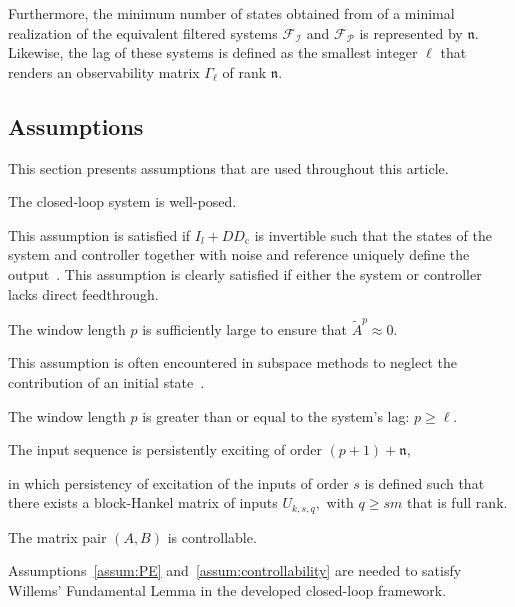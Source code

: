Furthermore, the minimum number of states obtained from of a minimal realization of the equivalent filtered systems $\mathcal{F}_\mathcal{I}$ and $\mathcal{F}_\mathcal{P}$ is represented by $\mathfrak{n}$. Likewise, the lag of these systems is defined as the smallest integer $\ell$ that renders an observability matrix $\Gamma_\ell$ of rank $\mathfrak{n}$.

\subsection{Assumptions}
This section presents assumptions that are used throughout this article.
\begin{assum}\label{assum:well_posed}
    The closed-loop system is well-posed.
\end{assum}
This assumption is satisfied if $I_l+DD_\mathrm{c}$ is invertible such that the states of the system and controller together with noise and reference uniquely define the output~\citep{VanOverschee1997}. This assumption is clearly satisfied if either the system or controller lacks direct feedthrough.
\begin{assum}\label{assum:initial_contribution}
    The window length $p$ is sufficiently large to ensure that $\tilde{A}^p\approx0$.
\end{assum}
This assumption is often encountered in subspace methods to neglect the contribution of an initial state~\citep{Chiuso2007}.
\begin{assum}\label{assum:unique_initial}
    The window length $p$ is greater than or equal to the system's lag: $p\geq\ell$.
\end{assum}
\begin{assum}\label{assum:PE}
    The input sequence is persistently exciting of order $(p+1)+\mathfrak{n},$
\end{assum}
in which persistency of excitation of the inputs of order $s$ is defined such that there exists a block-Hankel matrix of inputs $U_{k,s,q},$ with $q\geq sm$ that is full rank.
\begin{assum}\label{assum:controllability}
    The matrix pair $(A,B)$ is controllable.
\end{assum}
Assumptions~\ref{assum:PE} and~\ref{assum:controllability} are needed to satisfy Willems' Fundamental Lemma in the developed closed-loop framework.